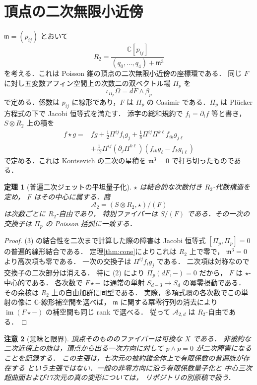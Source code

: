 \documentclass[11pt,a4paper]{ltjsarticle}
\newtheorem{theorem}{定理}[section]
\newtheorem{remark}[theorem]{注意}
\newcommand{\C}{\mathbb C}
\begin{document}
\section{頂点の二次無限小近傍}
$\mathfrak m=(p_{ij})$ とおいて
\[
R_2=
\frac{\C[p_{ij}]}
{(q_0,\ldots,q_4)+\mathfrak m^3}
\]
を考える．これは Poisson 錐の頂点の二次無限小近傍の座標環である．
同じ $F$ に対し五変数アフィン空間上の次数二の双ベクトル場
$\Pi_p$ を
\[
\iota_{\Pi_p}\Omega=dF\wedge\beta_p
\tag{2}
\]
で定める．係数は $p_{ij}$ に線形であり，$F$ は
$\Pi_p$ の Casimir である．$\Pi_p$ は Pl\"ucker 方程式の下で
Jacobi 恒等式を満たす．
添字の総和規約で $f_i=\partial_i f$ 等と書き，$S\otimes R_2$ 上の積を
\[
\begin{aligned}
f\star g={}&fg+\frac12\Pi^{ij}f_i g_j
+\frac18\Pi^{ij}\Pi^{k\ell}f_{ik}g_{j\ell}\\
&+\frac1{12}\Pi^{ij}(\partial_j\Pi^{k\ell})
  (f_{ik}g_\ell-f_k g_{i\ell})
\end{aligned}
\tag{3}
\]
で定める．これは Kontsevich の二次の星積を
$\mathfrak m^3=0$ で打ち切ったものである．
\begin{theorem}[普遍二次ジェットの平坦量子化]
$\star$ は結合的な次数付き $R_2$-代数構造を定め，
$F$ はその中心に属する．商
\[
\mathcal A_2=(S\otimes R_2,\star)/(F)
\]
は次数ごとに $R_2$-自由であり，
特別ファイバーは $S/(F)$ である．その一次の交換子は
$\Pi_p$ の Poisson 括弧に一致する．
\end{theorem}
\begin{proof}
(3) の結合性を二次まで計算した際の障害は
Jacobi 恒等式 $[\Pi_p,\Pi_p]=0$ の普遍的線形結合である．
定理\ref{thm:cone}によりこれは $R_2$ 上で零で，
$\mathfrak m^3=0$ より高次項も零である．
一次の交換子は $\Pi^{ij}f_i g_j$ である．
二次項は対称なので交換子の二次部分は消える．
特に (2) により $\Pi_p(dF,-)=0$ だから，
$F$ は $\star$-中心的である．
各次数で $F\star-$ は通常の単射
$S_{d-3}\to S_d$ の冪零摂動である．
その余核は $R_2$ 上の自由加群に同型である．
実際，多項式環の各次数でこの単射の像に
$\C$-線形補空間を選べば，
$\mathfrak m$ に関する冪零行列の消去により
$\operatorname{im}(F\star-)$ の補空間も同じ rank で選べる．
従って $\mathcal A_{2,d}$ は $R_2$-自由である．
\end{proof}

\begin{remark}[意味と限界]
頂点そのもののファイバーは可換な $X$ である．
非被約な二次近傍上の族は，頂点から出る一次方向に対して
$p\wedge p=0$ が二次障害になることを記録する．
この主張は，七次元の被約錐全体上で有限係数の普遍族が存在する
という主張ではない．一般の非零方向に沿う有限係数量子化と
中心三次超曲面および17次元の真の変形については，
リポジトリの別原稿で扱う．
\end{remark}
\end{document}
